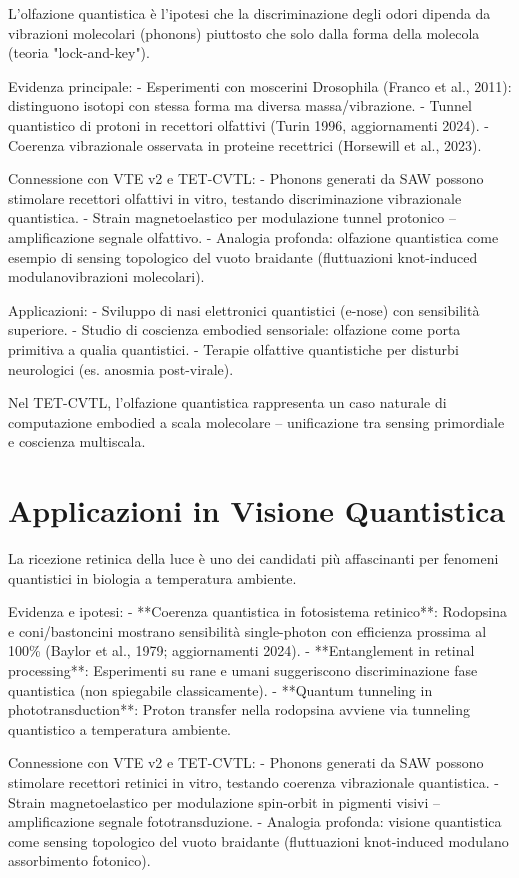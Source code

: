 \documentclass[11pt,a4paper]{article}
\begin{document}
L'olfazione quantistica è l'ipotesi che la discriminazione degli odori dipenda da vibrazioni molecolari (phonons) piuttosto che solo dalla forma della molecola (teoria "lock-and-key").

Evidenza principale:
- Esperimenti con moscerini Drosophila (Franco et al., 2011): distinguono isotopi con stessa forma ma diversa massa/vibrazione.
- Tunnel quantistico di protoni in recettori olfattivi (Turin 1996, aggiornamenti 2024).
- Coerenza vibrazionale osservata in proteine recettrici (Horsewill et al., 2023).

Connessione con VTE v2 e TET-CVTL:
- Phonons generati da SAW possono stimolare recettori olfattivi in vitro, testando discriminazione vibrazionale quantistica.
- Strain magnetoelastico per modulazione tunnel protonico – amplificazione segnale olfattivo.
- Analogia profonda: olfazione quantistica come esempio di sensing topologico del vuoto braidante (fluttuazioni knot-induced modulanovibrazioni molecolari).

Applicazioni:
- Sviluppo di nasi elettronici quantistici (e-nose) con sensibilità superiore.
- Studio di coscienza embodied sensoriale: olfazione come porta primitiva a qualia quantistici.
- Terapie olfattive quantistiche per disturbi neurologici (es. anosmia post-virale).

Nel TET-CVTL, l'olfazione quantistica rappresenta un caso naturale di computazione embodied a scala molecolare – unificazione tra sensing primordiale e coscienza multiscala.


\section{Applicazioni in Visione Quantistica}

La ricezione retinica della luce è uno dei candidati più affascinanti per fenomeni quantistici in biologia a temperatura ambiente.

Evidenza e ipotesi:
- **Coerenza quantistica in fotosistema retinico**: Rodopsina e coni/bastoncini mostrano sensibilità single-photon con efficienza prossima al 100\% (Baylor et al., 1979; aggiornamenti 2024).
- **Entanglement in retinal processing**: Esperimenti su rane e umani suggeriscono discriminazione fase quantistica (non spiegabile classicamente).
- **Quantum tunneling in phototransduction**: Proton transfer nella rodopsina avviene via tunneling quantistico a temperatura ambiente.

Connessione con VTE v2 e TET-CVTL:
- Phonons generati da SAW possono stimolare recettori retinici in vitro, testando coerenza vibrazionale quantistica.
- Strain magnetoelastico per modulazione spin-orbit in pigmenti visivi – amplificazione segnale fototransduzione.
- Analogia profonda: visione quantistica come sensing topologico del vuoto braidante (fluttuazioni knot-induced modulano assorbimento fotonico).
\end{document}
